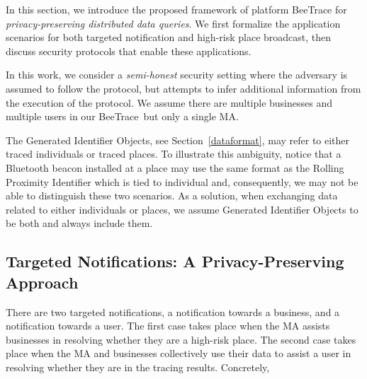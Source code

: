 \documentclass[11pt]{article}  %
\newcommand{\sysname}{\textsf{BeeTrace}\xspace}
\begin{document}
In this section, we introduce the proposed framework of platform \sysname for \emph{privacy-preserving distributed data queries}. We first formalize the application scenarios for both targeted notification and high-risk place broadcast, then discuss security protocols that enable these applications. %

In this work, we consider a \emph{semi-honest} security setting where the adversary is assumed to follow the protocol, but attempts to infer additional information from the execution of the protocol. We assume there are multiple businesses and multiple users in our \sysname\ but only a single MA. %

The Generated Identifier Objects, see Section~\ref{dataformat}, may refer to either traced individuals or traced places. 
To illustrate this ambiguity, notice that a Bluetooth beacon installed at a place may use the same format as the Rolling Proximity Identifier which is tied to individual and, consequently, we may not be able to distinguish these two scenarios. 
As a solution, when exchanging data related to either individuals or places, we assume Generated Identifier Objects to be both and always include them.

\subsection{Targeted Notifications: A  Privacy-Preserving Approach}
There are two targeted notifications, a notification towards a business, and  a notification towards a user. The first case takes place when the MA assists businesses in resolving  whether they are a high-risk place. The second case takes place when the MA and businesses collectively use their data to assist a user in resolving whether they are in the tracing results. Concretely,
\end{document}
